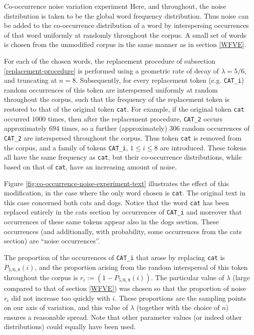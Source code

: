 \documentclass{article} %
\newcommand{\word}[1]{\texttt{#1}}
\begin{document}
\begin{section}{Co-occurrence noise variation experiment}\label{CNVE}
Here, and throughout, the noise distribution is taken to be the global word frequency distribution.
Thus noise can be added to the co-occurrence distribution of a word by interspersing occurrences of that word uniformly at randomly throughout the corpus.
A small set of words is chosen from the unmodified corpus in the same manner as in section \ref{WFVE}.

For each of the chosen words, the replacement procedure of subsection \ref{replacement-procedure} is performed using a geometric rate of decay of $\lambda = 5/6$, and truncating at $n=8$.
Subsequently, for every replacement token (e.g. \word{CAT\_i}) random occurrences of this token are interspersed uniformly at random throughout the corpus, such that the frequency of the replacement token is restored to that of the original token \word{cat}.
For example, if the original token \word{cat} occurred $1000$ times, then after the replacement procedure, \word{CAT\_2} occurs approximately $694$ times, so a further (approximately) $306$ random occurrences of \word{CAT\_2} are interspersed throughout the corpus.
Thus token \word{cat} is removed from the corpus, and a family of tokens \word{CAT\_i}, $1 \leqslant i \leqslant 8$ are introduced.
These tokens all have the same frequency as \word{cat}, but their co-occurrence distributions, while based on that of \word{cat}, have an increasing amount of noise.

Figure \ref{fig:co-occurrence-noise-experiment-text} illustrates the effect of this modification, in the case where the only word chosen is \word{cat}.
The original text in this case concerned both cats and dogs.
Notice that the word \word{cat} has been replaced entirely in the cats section by occurrences of \word{CAT\_i} and moreover that occurrences of these same tokens appear also in the dogs section. These occurrences (and additionally, with probability, some occurrences from the cats section) are ``noise occurrences''.

The proportion of the occurrences of \word{CAT\_i} that arose by replacing \word{cat} is $P_{5/6, 8}(i)$, and the proportion arising from the random interspersal of this token throughout the corpus is $r_i := (1 - P_{5/6, 8}(i))$.
The particular value of $\lambda$ (large compared to that of section \ref{WFVE}) was chosen so that the proportion of noise $r_i$ did not increase too quickly with $i$.
These proportions are the sampling points on our axis of variation, and this value of $\lambda$ (together with the choice of $n$) ensures a reasonable spread.
Note that other parameter values (or indeed other distributions) could equally have been used.


\end{section}
\end{document}
